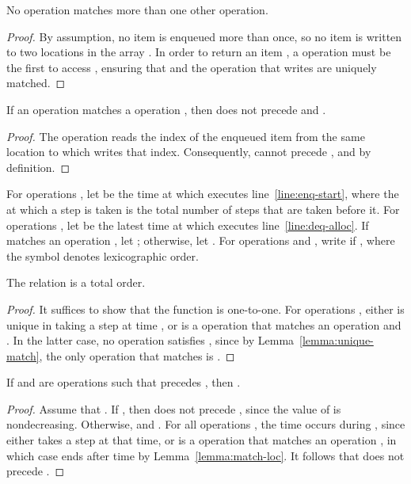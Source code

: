 \begin{lemma}
\label{lemma:unique-match}
No operation matches more than one other operation. 
\end{lemma}
\begin{proof}
By assumption, 
no item is enqueued more than once, 
so no item is written to two locations in the array . 
In order to return an item , 
a  operation  must be the first 
to access , 
ensuring that  and the  operation 
that writes  are uniquely matched. 
\end{proof}

\begin{lemma}
\label{lemma:match-loc}
If an  operation  
matches a  operation , 
then  does not precede  and . 
\end{lemma}
\begin{proof}
The operation  reads the index of the enqueued item 
from the same location to which  writes that index. 
Consequently,  cannot precede , 
and  by definition. 
\end{proof}

For  operations , 
let  be the time 
at which  executes line~\ref{line:enq-start}, 
where the  at which a step is taken 
is the total number of steps that are taken before it. 
For  operations , 
let  be the latest time 
at which  executes line~\ref{line:deq-alloc}. 
If  matches an  operation , 
let ; 
otherwise, let . 
For operations  and , 
write  
if , 
where the symbol  denotes lexicographic order. 

\begin{lemma}
\label{lemma:total-order}
The relation  is a total order. 
\end{lemma}
\begin{proof}
It suffices to show that the function  is one-to-one. 
For operations , 
either  is unique in taking a step at time , 
or  is a  operation 
that matches an  operation  
and . 
In the latter case, 
no operation  satisfies , 
since by Lemma~\ref{lemma:unique-match}, 
the only operation that matches  is . 
\end{proof}

\begin{lemma}
\label{lemma:precedes}
If  and  are operations such that  precedes , 
then . 
\end{lemma}
\begin{proof}
Assume that . 
If , then  does not precede , 
since the value of  is nondecreasing. 
Otherwise,  and . 
For all operations , 
the time  occurs during , 
since either  takes a step at that time, 
or  is a  operation 
that matches an  operation , 
in which case  ends after time  
by Lemma~\ref{lemma:match-loc}. 
It follows that  does not precede . 
\end{proof}

